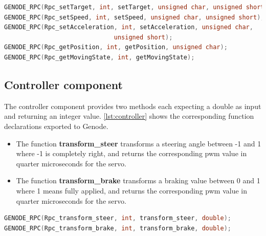 \begin{lstlisting}[language=c, frame=single, basicstyle=\footnotesize,  label={lst:servo}, caption=Genode interface for servo component]
GENODE_RPC(Rpc_setTarget, int, setTarget, unsigned char, unsigned short);
GENODE_RPC(Rpc_setSpeed, int, setSpeed, unsigned char, unsigned short);
GENODE_RPC(Rpc_setAcceleration, int, setAcceleration, unsigned char, 
						      unsigned short);
GENODE_RPC(Rpc_getPosition, int, getPosition, unsigned char);
GENODE_RPC(Rpc_getMovingState, int, getMovingState);
\end{lstlisting}



\subsection{Controller component}
\label{sec:comp-controller}

The controller component provides two methods each expecting a double as input and returning an integer value.
\autoref{lst:controller} shows the corresponding function declarations exported to Genode.
\begin{itemize}
\item The function \textbf{transform\_steer} transforms a steering angle between -1 and 1 where -1 is completely right, and returns the corresponding pwm value in quarter microseconds for the servo.
\item The function \textbf{transform\_brake} transforms a braking value between 0 and 1 where 1 means fully applied, and returns the corresponding pwm value in quarter microseconds for the servo.
\end{itemize}

\begin{lstlisting}[language=c, frame=single, basicstyle=\footnotesize,  label={lst:controller}, caption=Genode interface for controller component]
GENODE_RPC(Rpc_transform_steer, int, transform_steer, double);
GENODE_RPC(Rpc_transform_brake, int, transform_brake, double);
\end{lstlisting}
